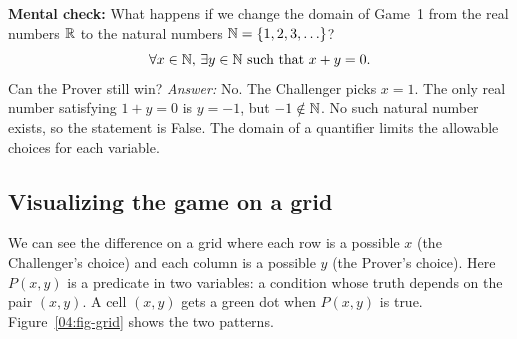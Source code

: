 \begin{recoverybox}
\textbf{Mental check:} What happens if we change the domain of Game~1 from the real numbers $\mathbb{R}$ to the natural numbers $\mathbb{N} = \{1, 2, 3, \ldots\}$?
\[
\forall x \in \mathbb{N}, \, \exists y \in \mathbb{N} \text{ such that } x + y = 0.
\]
Can the Prover still win?
\emph{Answer:} No. The Challenger picks $x = 1$. The only real number satisfying $1 + y = 0$ is $y = -1$, but $-1 \notin \mathbb{N}$. No such natural number exists, so the statement is False. The domain of a quantifier limits the allowable choices for each variable.
\end{recoverybox}

\subsection{Visualizing the game on a grid}

We can see the difference on a grid where each row is a possible $x$ (the Challenger's choice) and each column is a possible $y$ (the Prover's choice). Here $P(x, y)$ is a predicate in two variables: a condition whose truth depends on the pair $(x, y)$. A cell $(x, y)$ gets a green dot when $P(x, y)$ is true. Figure~\ref{04:fig-grid} shows the two patterns.

